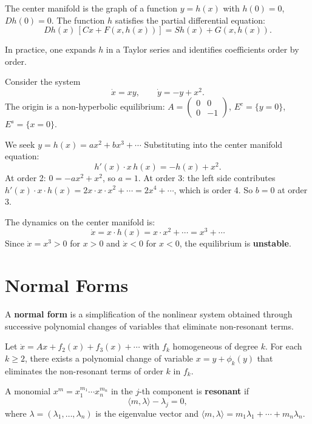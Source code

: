 The center manifold is the graph of a function $y = h(x)$ with $h(0) = 0$,
$Dh(0) = 0$. The function $h$ satisfies the partial differential equation:
\[
    Dh(x)\,[Cx + F(x, h(x))] = Sh(x) + G(x, h(x)).
\]

In practice, one expands $h$ in a Taylor series and identifies coefficients
order by order.

\begin{example}
Consider the system
\[
    \dot{x} = xy, \qquad \dot{y} = -y + x^2.
\]
The origin is a non-hyperbolic equilibrium:
$A = \begin{pmatrix} 0 & 0 \\ 0 & -1 \end{pmatrix}$, $E^c = \{y = 0\}$,
$E^s = \{x = 0\}$.

We seek $y = h(x) = ax^2 + bx^3 + \cdots$ Substituting into the center
manifold equation:
\[
    h'(x) \cdot x\,h(x) = -h(x) + x^2.
\]
At order 2: $0 = -ax^2 + x^2$, so $a = 1$.
At order 3: the left side contributes $h'(x) \cdot x \cdot h(x) = 2x \cdot x \cdot x^2 + \cdots = 2x^4 + \cdots$,
which is order 4. So $b = 0$ at order 3.

The dynamics on the center manifold is:
\[
    \dot{x} = x \cdot h(x) = x \cdot x^2 + \cdots = x^3 + \cdots
\]
Since $\dot{x} = x^3 > 0$ for $x > 0$ and $\dot{x} < 0$ for $x < 0$,
the equilibrium is \textbf{unstable}.
\end{example}

\section{Normal Forms}

\begin{definition}
A \textbf{normal form} is a simplification of the nonlinear system obtained
through successive polynomial changes of variables that eliminate
non-resonant terms.
\end{definition}

\begin{theorem}
Let $\dot{x} = Ax + f_2(x) + f_3(x) + \cdots$ with $f_k$ homogeneous of
degree $k$. For each $k \geq 2$, there exists a polynomial change of
variable $x = y + \phi_k(y)$ that eliminates the non-resonant terms of
order $k$ in $f_k$.
\end{theorem}

\begin{definition}[Resonance]
A monomial $x^m = x_1^{m_1} \cdots x_n^{m_n}$ in the $j$-th component is
\textbf{resonant} if
\[
    \langle m, \lambda \rangle - \lambda_j = 0,
\]
where $\lambda = (\lambda_1, \ldots, \lambda_n)$ is the eigenvalue vector
and $\langle m, \lambda \rangle = m_1\lambda_1 + \cdots + m_n\lambda_n$.
\end{definition}

